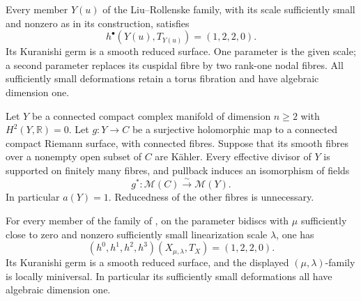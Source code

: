 
\begin{proposition}\hypertarget{tag-01GL}{}\label{cdp:st:E14}


Every member $Y(u)$ of the Liu--Rollenske family, with its scale
sufficiently small and nonzero as in its construction, satisfies
\[
 h^\bullet(Y(u),T_{Y(u)})=(1,2,2,0).
\]
Its Kuranishi germ is a smooth reduced surface. One parameter is
the given scale; a second parameter replaces its cuspidal fibre by
two rank-one nodal fibres. All sufficiently small deformations
retain a torus fibration and have algebraic dimension one.
\end{proposition}

\begin{proposition}\hypertarget{tag-01GG}{}\label{cdp:st:E1}


Let $Y$ be a connected compact complex manifold of dimension $n\geq2$
with $H^2(Y,\mathbb R)=0$. Let $g:Y\to C$ be a surjective holomorphic
map to a connected compact Riemann surface, with connected fibres.
Suppose that its smooth fibres over a nonempty open subset of $C$ are
K\"ahler. Every effective divisor of $Y$ is supported on finitely many
fibres, and pullback induces an isomorphism of fields
\[
 g^*: \mathcal M(C)\xrightarrow{\ \sim\ }\mathcal M(Y).
\]
In particular $a(Y)=1$. Reducedness of the other fibres is unnecessary.
\end{proposition}

\begin{proposition}\hypertarget{tag-01GK}{}\label{cdp:st:E13}


For every member of the family of
\cite[Proposition labelled \texttt{family}]{Viaclovsky2026Two}, on the parameter
bidiscs with $\mu$ sufficiently close to zero and nonzero sufficiently
small linearization scale $\lambda$, one has
\[
 (h^0,h^1,h^2,h^3)(X_{\mu,\lambda},T_X)=(1,2,2,0).
\]
Its Kuranishi germ is a smooth reduced surface, and the displayed
$(\mu,\lambda)$-family is locally miniversal. In particular its
sufficiently small deformations all have algebraic dimension one.
\end{proposition}

